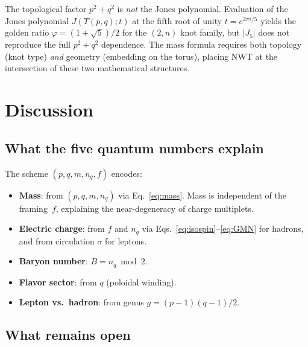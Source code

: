 \documentclass[11pt,a4paper]{article}
\begin{document}
The topological factor $p^2 + q^2$ is \emph{not} the Jones
polynomial.  Evaluation of the Jones polynomial $J(T(p,q); t)$
at the fifth root of unity $t = e^{2\pi i/5}$ yields the
golden ratio $\varphi = (1+\sqrt{5})/2$ for the $(2,n)$ knot
family, but $|J_5|$ does not reproduce the full $p^2 + q^2$
dependence.  The mass formula requires both topology (knot type)
\emph{and} geometry (embedding on the torus), placing NWT at the
intersection of these two mathematical structures.


\section{Discussion}
\label{sec:discussion}

\subsection{What the five quantum numbers explain}

The scheme $(p, q, m, n_q, f)$ encodes:
\begin{itemize}
\item \textbf{Mass}: from $(p, q, m, n_q)$ via Eq.~\eqref{eq:mass}.
  Mass is independent of the framing~$f$, explaining the
  near-degeneracy of charge multiplets.
\item \textbf{Electric charge}: from $f$ and $n_q$ via
  Eqs.~\eqref{eq:isospin}--\eqref{eq:GMN} for hadrons, and
  from circulation $\sigma$ for leptons.
\item \textbf{Baryon number}: $B = n_q \bmod 2$.
\item \textbf{Flavor sector}: from $q$ (poloidal winding).
\item \textbf{Lepton vs.\ hadron}: from genus $g = (p-1)(q-1)/2$.
\end{itemize}

\subsection{What remains open}
\end{document}
